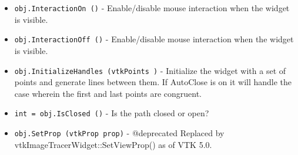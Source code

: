 \begin{itemize}
\item  \verb|obj.InteractionOn ()| -  Enable/disable mouse interaction when the widget is visible.

\item  \verb|obj.InteractionOff ()| -  Enable/disable mouse interaction when the widget is visible.

\item  \verb|obj.InitializeHandles (vtkPoints )| -  Initialize the widget with a set of points and generate
 lines between them.  If AutoClose is on it will handle the
 case wherein the first and last points are congruent.

\item  \verb|int = obj.IsClosed ()| -  Is the path closed or open?

\item  \verb|obj.SetProp (vtkProp prop)| -  @deprecated Replaced by vtkImageTracerWidget::SetViewProp() as of VTK 5.0.

\end{itemize}
